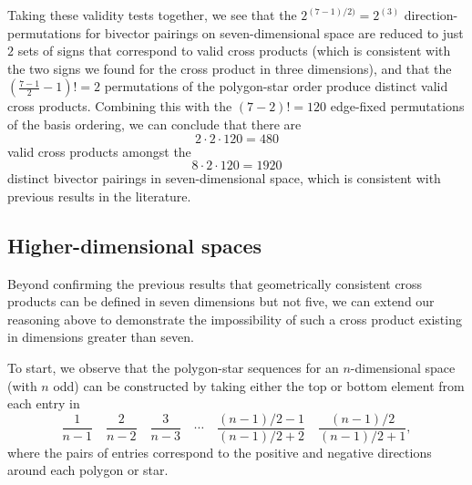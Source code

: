\documentclass[11pt]{article}
\begin{document}
Taking these validity tests together, we see that the $2^{(7-1)/2)} = 2^{(3)}$  direction-permutations for bivector pairings on seven-dimensional space are reduced to just $2$ sets of signs that correspond to valid cross products (which is consistent with the two signs we found for the cross product in three dimensions), and that the $(\frac{7-1}{2} -1)! = 2$ permutations of the polygon-star order produce distinct valid cross products. Combining this with the $(7-2)! = 120 $ edge-fixed permutations of the basis ordering, we can conclude that there are
\begin{equation}
2 \cdot 2 \cdot 120 = 480
\end{equation}
valid cross products amongst the 
\begin{equation}
8 \cdot 2 \cdot 120 = 1920
\end{equation}
distinct bivector pairings in seven-dimensional space, which is consistent with previous results in the literature.

\subsection{Higher-dimensional spaces}

Beyond confirming the previous results that geometrically consistent cross products can be defined in seven dimensions but not five, we can extend our reasoning above to demonstrate the impossibility of such a cross product existing in dimensions greater than seven.

To start, we observe that the polygon-star sequences for an $n$-dimensional space (with $n$ odd) can be constructed by taking either the top or bottom element from each entry in
\begin{equation}
\frac{1}{n-1}\hspace{1em}\frac{2}{n-2} \hspace{1em} \frac{3}{n-3}\hspace{1em} \cdots \hspace{1em} \frac{(n-1)/2 -1}{(n-1)/2 +2} \hspace{1em} \frac{(n-1)/2}{(n-1)/2 +1},
\end{equation}
where the pairs of entries correspond to the positive and negative directions around each polygon or star.
\end{document}
